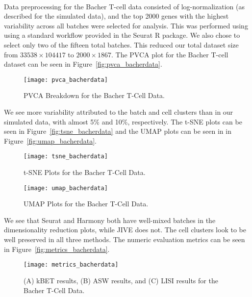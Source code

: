\documentclass[
12pt, %
letterpaper, %
oneside, %
headinclude,footinclude, %
BCOR5mm, %
]{scrartcl}
\begin{document}
\paragraph*{}
Data preprocessing for the Bacher T-cell data consisted of log-normalization (as described for the simulated data), and the top 2000 genes with the highest variability across all batches were selected for analysis. This was performed using using a standard workflow provided in the Seurat R package. We also chose to select only two of the fifteen total batches. This reduced our total dataset size from $33538 \times 104417$ to $2000 \times 1867$. The PVCA plot for the Bacher T-cell dataset can be seen in Figure~\vref{fig:pvca_bacherdata}.

\begin{figure}[H]
    \centering 
    \texttt{[image: pvca\_bacherdata]} 
    \caption[PVCA Breakdown for the Bacher T-Cell Data]{PVCA Breakdown for the Bacher T-Cell Data.}
    \label{fig:pvca_bacherdata} 
\end{figure}

We see more variability attributed to the batch and cell clusters than in our simulated data, with almost 5\% and 10\%, respectively. The t-SNE plots can be seen in Figure~\vref{fig:tsne_bacherdata} and the UMAP plots can be seen in in Figure~\vref{fig:umap_bacherdata}.

\begin{figure}[H]
    \centering 
    \texttt{[image: tsne\_bacherdata]} 
    \caption[t-SNE Plots for the Bacher T-Cell Data]{t-SNE Plots for the Bacher T-Cell Data.}
    \label{fig:tsne_bacherdata}
\end{figure}

\begin{figure}[H]
    \centering 
    \texttt{[image: umap\_bacherdata]} 
    \caption[UMAP Plots for the Bacher T-Cell Data]{UMAP Plots for the Bacher T-Cell Data.}
    \label{fig:umap_bacherdata} 
\end{figure}

We see that Seurat and Harmony both have well-mixed batches in the dimensionality reduction plots, while JIVE does not. The cell clusters look to be well preserved in all three methods. The numeric evaluation metrics can be seen in Figure~\vref{fig:metrics_bacherdata}.

\begin{figure}[H]
    \centering 
    \texttt{[image: metrics\_bacherdata]} 
    \caption[Metrics for the Bacher T-Cell Data]{(A) kBET results, (B) ASW results, and (C) LISI results for the Bacher T-Cell Data.}
    \label{fig:metrics_bacherdata} 
\end{figure}
\end{document}
